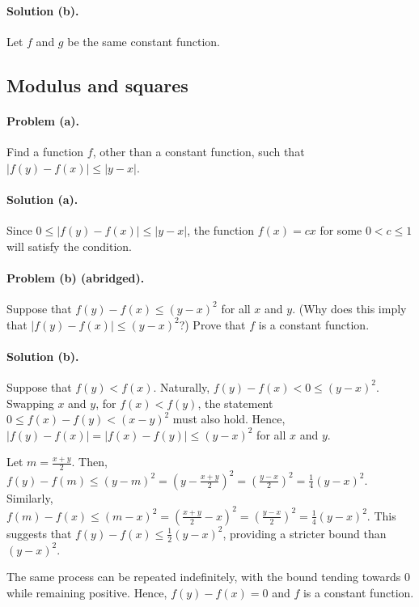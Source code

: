 \documentclass{article}
\begin{document}
\paragraph{Solution (b).} Let $f$ and $g$ be the same constant function.

\setcounter{subsection}{19}
\subsection{Modulus and squares}

\paragraph{Problem (a).} Find a function $f$, other than a constant function,
such that $|f(y) - f(x)| \leq |y - x|$.

\paragraph{Solution (a).} Since $0 \leq |f(y) - f(x)| \leq |y - x|$, the
function $f(x) = cx$ for some $0 < c \leq 1$ will satisfy the condition.

\paragraph{Problem (b) (abridged).} Suppose that $f(y) - f(x) \leq (y - x)^2$
for all $x$ and $y$. (Why does this imply that $|f(y) - f(x)| \leq (y - x)^2$?)
Prove that $f$ is a constant function.

\paragraph{Solution (b).} Suppose that $f(y) < f(x)$. Naturally, $f(y) - f(x) <
0 \leq (y - x)^2$. Swapping $x$ and $y$, for $f(x) < f(y)$, the statement $0
\leq f(x) - f(y) < (x - y)^2$ must also hold. Hence, $|f(y) - f(x)| = |f(x) -
f(y)| \leq (y - x)^2$ for all $x$ and $y$.

Let $m = \frac{x + y}{2}$. Then, $f(y) - f(m) \leq (y - m)^2 = \left(y -
\frac{x + y}{2}\right)^2 = \left(\frac{y - x}{2}\right)^2 = \frac{1}{4}(y -
x)^2$. Similarly, $f(m) - f(x) \leq (m - x)^2 = \left(\frac{x + y}{2} -
x\right)^2 = \left(\frac{y - x}{2}\right)^2 = \frac{1}{4}(y - x)^2$. This
suggests that $f(y) - f(x) \leq \frac{1}{2}(y - x)^2$, providing a stricter
bound than $(y - x)^2$.

The same process can be repeated indefinitely, with the bound tending towards 0
while remaining positive. Hence, $f(y) - f(x) = 0$ and $f$ is a constant
function.
\end{document}
